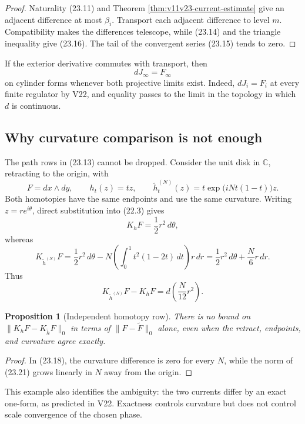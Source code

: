 \documentclass[11pt]{article}
\newtheorem{proposition}[theorem]{Proposition}
\begin{document}
\begin{proof}
Naturality (23.11) and Theorem
\ref{thm:v11v23-current-estimate} give an adjacent difference at most
\(\beta_i\).  Transport each adjacent difference to level \(m\).
Compatibility makes the differences telescope, while (23.14) and the
triangle inequality give (23.16).  The tail of the convergent series
(23.15) tends to zero.
\end{proof}

If the exterior derivative commutes with transport, then
\[
 dJ_\infty=F_\infty
 \tag{23.17}
\]
on cylinder forms whenever both projective limits exist.  Indeed,
\(dJ_i=F_i\) at every finite regulator by V22, and equality passes to the
limit in the topology in which \(d\) is continuous.

\subsection{Why curvature comparison is not enough}

The path rows in (23.13) cannot be dropped.  Consider the unit disk in
\(\mathbb C\), retracting to the origin, with
\[
 F=dx\wedge dy,\qquad
 h_t(z)=tz,\qquad
 \widetilde h^{(N)}_t(z)
   =t\exp\!\bigl(iN t(1-t)\bigr)z.
 \tag{23.18}
\]
Both homotopies have the same endpoints and use the same curvature.
Writing \(z=re^{i\theta}\), direct substitution into (22.3) gives
\[
 K_hF=\frac12r^2\,d\theta,
 \tag{23.19}
\]
whereas
\[
 K_{\widetilde h^{(N)}}F
 =
 \frac12r^2\,d\theta
 -N\left(\int_0^1t^2(1-2t)\,dt\right)r\,dr
 =
 \frac12r^2\,d\theta+\frac N6r\,dr.
 \tag{23.20}
\]
Thus
\[
 K_{\widetilde h^{(N)}}F-K_hF
 =d\left(\frac N{12}r^2\right).
 \tag{23.21}
\]

\begin{proposition}[Independent homotopy row]
\label{prop:v11v23-independent-row}
There is no bound on
\(\|K_hF-K_{\widetilde h}F\|_0\) in terms of
\(\|F-\widetilde F\|_0\) alone, even when the retract, endpoints, and
curvature agree exactly.
\end{proposition}

\begin{proof}
In (23.18), the curvature difference is zero for every \(N\), while the
norm of (23.21) grows linearly in \(N\) away from the origin.
\end{proof}

This example also identifies the ambiguity: the two currents differ by
an exact one-form, as predicted in V22.  Exactness controls curvature but
does not control scale convergence of the chosen phase.
\end{document}
